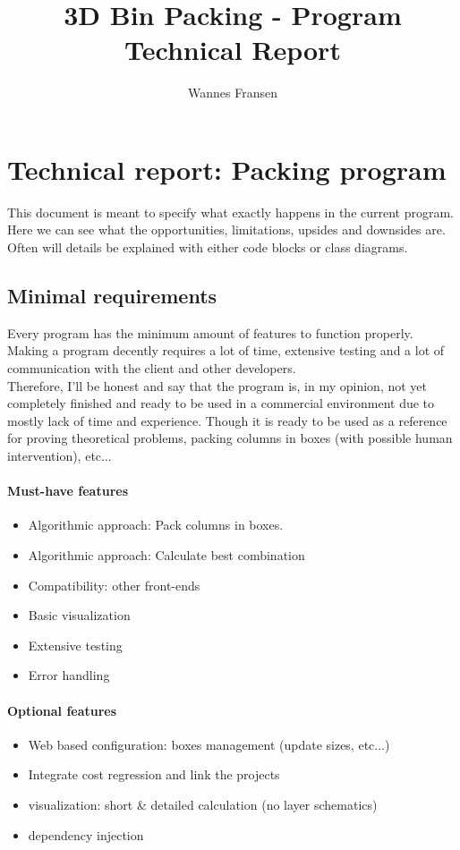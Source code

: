 \documentclass[a4paper,12pt]{article}
\begin{document}
\newcommand{\xmark}{\ding{55}}

\author{Wannes Fransen}
\title{3D Bin Packing - Program Technical Report}

\section{Technical report: Packing program}
This document is meant to specify what exactly happens in the current program. Here we can see what the opportunities, limitations, upsides and downsides are. Often will details be explained with either code blocks or class diagrams. 

\subsection{Minimal requirements}
Every program has the minimum amount of features to function properly. Making a program decently requires a lot of time, extensive testing and a lot of communication with the client and other developers. \\ 

Therefore, I'll be honest and say that the program is, in my opinion, not yet completely finished and ready to be used in a commercial environment due to mostly lack of time and experience. Though it is ready to be used as a reference for proving theoretical problems, packing columns in boxes (with possible human intervention), etc... \\

\paragraph{Must-have features}
\begin{itemize}
	\item[] \checkmark Algorithmic approach: Pack columns in boxes.
	\item[] \checkmark Algorithmic approach: Calculate best combination
	\item[] \checkmark Compatibility: other front-ends
	\item[] \checkmark Basic visualization
	\item[] \xmark \space Extensive testing
	\item[] \xmark \space Error handling \\
\end{itemize}

\paragraph{Optional features}
\begin{itemize}
	\item Web based configuration: boxes management (update sizes, etc...)
	\item Integrate cost regression and link the projects
	\item visualization: short \& detailed calculation (no layer schematics)
	\item dependency injection
\end{itemize}
\end{document}
